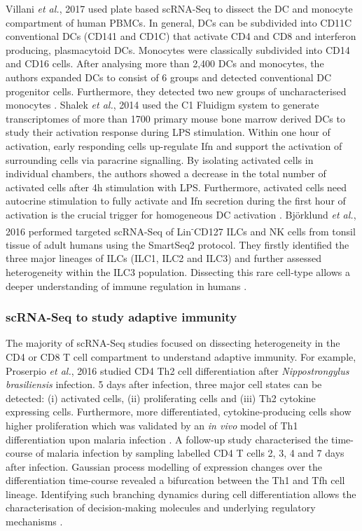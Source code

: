Villani \emph{et al.}, 2017 used plate based scRNA-Seq to dissect the \gls{DC} and monocyte compartment of human \glspl{PBMC}. In general, DCs can be subdivided into CD11C\plus{} conventional DCs (CD141\plus{} and CD1C\plus{}) that activate CD4\plus{} and CD8\plus{} and interferon producing, plasmacytoid DCs. Monocytes were classically subdivided into CD14\plus{} and CD16\plus{} cells. After analysing more than 2,400 DCs and monocytes, the authors expanded DCs to consist of 6 groups and detected conventional DC progenitor cells. Furthermore, they detected two new groups of uncharacterised monocytes \citep{Villani2017}. Shalek \emph{et al.}, 2014 used the C1 Fluidigm system to generate transcriptomes of more than 1700 primary mouse bone marrow derived DCs to study their activation response during \gls{LPS} stimulation. Within one hour of activation, early responding cells up-regulate \gls{Ifn}\textbeta{} and support the activation of surrounding cells via paracrine signalling. By isolating activated cells in individual chambers, the authors showed a decrease in the total number of activated cells after 4h stimulation with LPS. Furthermore, activated cells need autocrine stimulation to fully activate and Ifn\textbeta{} secretion during the first hour of activation is the crucial trigger for homogeneous DC activation \citep{Shalek2014}. Bj\"o{}rklund \emph{et al.}, 2016 performed targeted scRNA-Seq of Lin\textsuperscript{-}CD127\plus{} \glspl{ILC} and NK cells from tonsil tissue of adult humans using the SmartSeq2 protocol. They firstly identified the three major lineages of ILCs (ILC1, ILC2 and ILC3) and further assessed heterogeneity within the ILC3 population. Dissecting this rare cell-type allows a deeper understanding of immune regulation in humans \citep{Bjorklund2016}. 

\subsubsection{scRNA-Seq to study adaptive immunity}

The majority of scRNA-Seq studies focused on dissecting heterogeneity in the CD4\plus{} or CD8\plus{} T cell compartment to understand adaptive immunity. For example, Proserpio \emph{et al.}, 2016 studied CD4\plus{} Th2 cell differentiation after \textit{Nippostrongylus brasiliensis} infection. 5 days after infection, three major cell states can be detected: (i) activated cells, (ii) proliferating cells and (iii) Th2 cytokine expressing cells. Furthermore, more differentiated, cytokine-producing cells show higher proliferation which was validated by an \emph{in vivo} model of Th1 differentiation upon malaria infection \citep{Proserpio2016}. A follow-up study characterised the time-course of malaria infection by sampling labelled CD4\plus{} T cells 2, 3, 4 and 7 days after infection. Gaussian process modelling of expression changes over the differentiation time-course revealed a bifurcation between the Th1 and \gls{Tfh} cell lineage. Identifying such branching dynamics during cell differentiation allows the characterisation of decision-making molecules and underlying regulatory mechanisms \citep{Lonnberg2017}. \\

